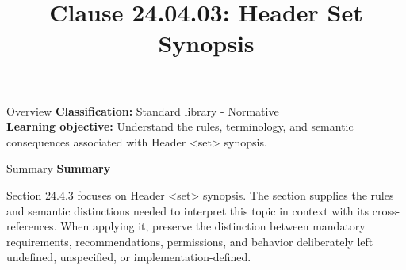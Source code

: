 \documentclass[10pt,letterpaper]{article}
\title{Clause 24.04.03: Header Set Synopsis}
\author{}
\date{}
\begin{document}
\maketitle
\begin{CornellOverviewBox}{Overview}
\textbf{Classification:} Standard library - Normative\\[2pt]
\textbf{Learning objective:} Understand the rules, terminology, and semantic consequences associated with Header <set> synopsis.
\end{CornellOverviewBox}\begin{CornellSummaryBox}{Summary}
{\sffamily\bfseries\color{Accent} Summary}\par\vspace{3pt}Section 24.4.3 focuses on Header <set> synopsis. The section supplies the rules and semantic distinctions needed to interpret this topic in context with its cross-references. When applying it, preserve the distinction between mandatory requirements, recommendations, permissions, and behavior deliberately left undefined, unspecified, or implementation-defined.
\end{CornellSummaryBox}
\end{document}
